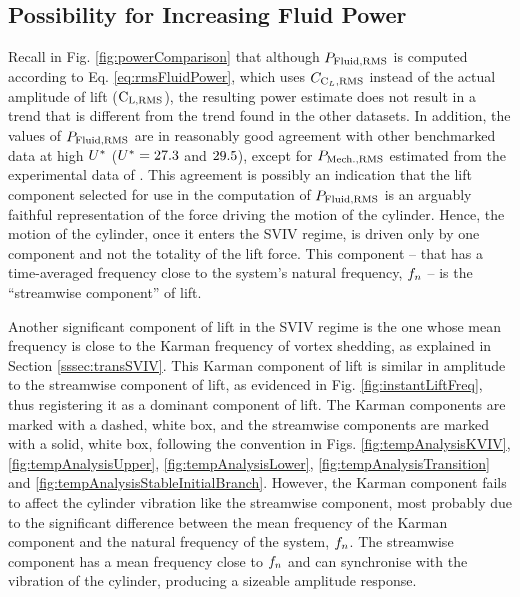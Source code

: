 \documentclass[oneside]{utmthesis}
\begin{document}
\subsection{Possibility for Increasing Fluid Power} \label{ssec:possIncrease}

Recall in Fig. \ref{fig:powerComparison} that although $P_{\text{Fluid,RMS}}$ is computed according to Eq. \ref{eq:rmsFluidPower}, which uses $C_{\text{C}_{L},\text{RMS}}$ instead of the actual \rms{} amplitude of lift ($\text{C}_{\text{L,RMS}}$), the resulting power estimate does not result in a trend that is different from the trend found in the other datasets. In addition, the values of $P_{\text{Fluid,RMS}}$ are in reasonably good agreement with other benchmarked data at high $U^{*}$ ($U^{*} = 27.3$ and $29.5$), except for $P_{\text{Mech.,RMS}}$ estimated from the experimental data of \citet{Nguyen2012}. This agreement is possibly an indication that the lift component selected for use in the computation of $P_{\text{Fluid,RMS}}$ is an arguably faithful representation of the force driving the motion of the cylinder. Hence, the motion of the cylinder, once it enters the SVIV regime, is driven only by one component and not the totality of the lift force. This component -- that has a time-averaged frequency close to the system's natural frequency, $f_{n}$ -- is the ``streamwise component'' of lift.

Another significant component of lift in the SVIV regime is the one whose mean frequency is close to the Karman frequency of vortex shedding, as explained in Section \ref{sssec:transSVIV}. This Karman component of lift is similar in amplitude to the streamwise component of lift, as evidenced in Fig. \ref{fig:instantLiftFreq}, thus registering it as a dominant component of lift. The Karman components are marked with a dashed, white box, and the streamwise components are marked with a solid, white box, following the convention in Figs. \ref{fig:tempAnalysisKVIV}, \ref{fig:tempAnalysisUpper}, \ref{fig:tempAnalysisLower}, \ref{fig:tempAnalysisTransition} and \ref{fig:tempAnalysisStableInitialBranch}. However, the Karman component fails to affect the cylinder vibration like the streamwise component, most probably due to the significant difference between the mean frequency of the Karman component and the natural frequency of the system, $f_{n}$.  The streamwise component has a mean frequency close to $f_{n}$ and can synchronise with the vibration of the cylinder, producing a sizeable amplitude response.
\end{document}
